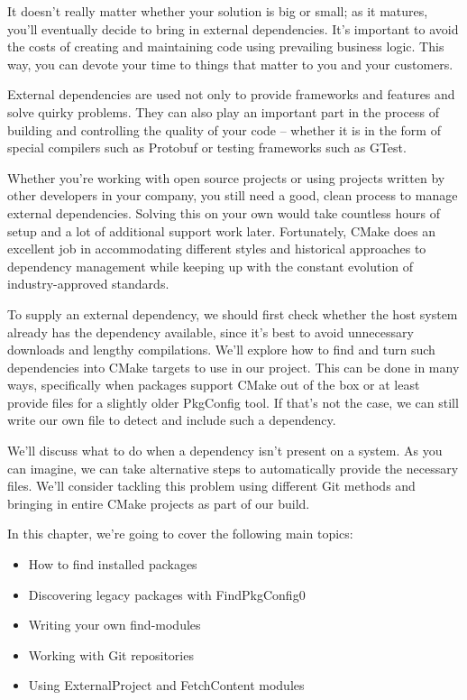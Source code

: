 It doesn't really matter whether your solution is big or small; as it matures, you'll eventually decide to bring in external dependencies. It's important to avoid the costs of creating and maintaining code using prevailing business logic. This way, you can devote your time to things that matter to you and your customers.

External dependencies are used not only to provide frameworks and features and solve quirky problems. They can also play an important part in the process of building and controlling the quality of your code – whether it is in the form of special compilers such as Protobuf or testing frameworks such as GTest.

Whether you're working with open source projects or using projects written by other developers in your company, you still need a good, clean process to manage external dependencies. Solving this on your own would take countless hours of setup and a lot of additional support work later. Fortunately, CMake does an excellent job in accommodating different styles and historical approaches to dependency management while keeping up with the constant evolution of industry-approved standards.

To supply an external dependency, we should first check whether the host system already has the dependency available, since it's best to avoid unnecessary downloads and lengthy compilations. We'll explore how to find and turn such dependencies into CMake targets to use in our project. This can be done in many ways, specifically when packages support CMake out of the box or at least provide files for a slightly older PkgConfig tool. If that's not the case, we can still write our own file to detect and include such a dependency.

We'll discuss what to do when a dependency isn't present on a system. As you can imagine, we can take alternative steps to automatically provide the necessary files. We'll consider tackling this problem using different Git methods and bringing in entire CMake projects as part of our build.

In this chapter, we're going to cover the following main topics:

\begin{itemize}
\item 
How to find installed packages

\item 
Discovering legacy packages with FindPkgConfig0

\item 
Writing your own find-modules

\item 
Working with Git repositories

\item 
Using ExternalProject and FetchContent modules
\end{itemize}
